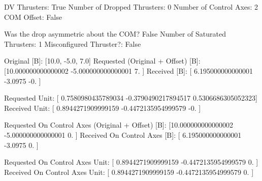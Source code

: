 DV Thrusters:	True
Number of Dropped Thrusters:	0
Number of Control Axes:	2
COM Offset:	False

Was the drop asymmetric about the COM?	False
Number of Saturated Thrusters:	1
Misconfigured Thruster?:	False

Original [B]:	[10.0, -5.0, 7.0]
Requested (Original + Offset) [B]:	[10.000000000000002 -5.000000000000001  7.               ]
Received [B]:		[ 6.195000000000001 -3.0975            -0.               ]

Requested Unit:		[ 0.7580980435789034 -0.3790490217894517  0.5306686305052323]
Received Unit:		[ 0.8944271909999159 -0.4472135954999579 -0.                ]

Requested On Control Axes (Original + Offset) [B]:	[10.000000000000002 -5.000000000000001  0.               ]
Received On Control Axes [B]:		[ 6.195000000000001 -3.0975             0.               ]

Requested On Control Axes Unit:		[ 0.8944271909999159 -0.4472135954999579  0.                ]
Received On Control Axes Unit:		[ 0.8944271909999159 -0.4472135954999579  0.                ]

